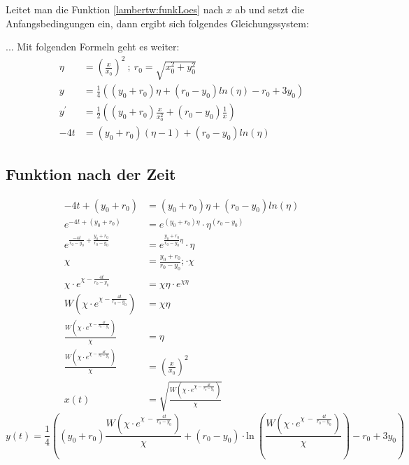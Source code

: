 Leitet man die Funktion \eqref{lambertw:funkLoes} nach \(x\) ab und setzt die Anfangsbedingungen ein, dann ergibt sich folgendes Gleichungssystem:

... Mit folgenden Formeln geht es weiter:
\begin{align*}
	\eta
	&=
	\left(\frac{x}{x_0}\right)^2 
	\:;\:
	r_0
	=
	\sqrt{x_0^2+y_0^2} \\
	y
	&=
	\frac{1}{4}\left(\left(y_0+r_0\right)\eta+\left(r_0-y_0\right)ln\left(\eta\right)-r_0+3y_0\right) \\
	y^\prime
	&=
	\frac{1}{2}\left(\left(y_0+r_0\right)\frac{x}{x_0^2}+\left(r_0-y_0\right)\frac{1}{x}\right) \\
	-4t
	&=
	\left(y_0+r_0\right)\left(\eta-1\right)+\left(r_0-y_0\right)ln\left(\eta\right)
\end{align*}

\subsection{Funktion nach der Zeit 
	\label{lambertw:subsection:FunkNachT}}
\begin{align*}
	-4t+\left(y_0+r_0\right)
	&=
	\left(y_0+r_0\right)\eta+\left(r_0-y_0\right)ln\left(\eta\right) \\
	e^{-4t+\left(y_0+r_0\right)}
	&=
	e^{\left(y_0+r_0\right)\eta}\cdot\eta^{\left(r_0-y_0\right)} \\
	e^{\frac{-4t}{r_0-y_0}+\frac{y_0+r_0}{r_0-y_0}}
	&=
	e^{\frac{y_0+r_0}{r_0-y_0}\eta}\cdot\eta\  \\
	\chi
	&=
	\frac{y_0+r_0}{r_0-y_0}; \cdot\chi \\
	\chi\cdot e^{\chi-\frac{4t}{r_0-y_0}}
	&=
	\chi\eta\cdot e^{\chi\eta} \\
	W\left(\chi\cdot e^{\chi-\frac{4t}{r_0-y_0}}\right)
	&=
	\chi\eta \\
	\frac{W\left(\chi\cdot e^{\chi-\frac{4t}{r_0-y_0}}\right)}{\chi}
	&=
	\eta \\
	\frac{W\left(\chi\cdot e^{\chi-\frac{4t}{r_0-y_0}}\right)}{\chi}
	&=
	\left(\frac{x}{x_0}\right)^2 \\
	x\left(t\right)
	&=
	\sqrt{\frac{W\left(\chi\cdot e^{\chi-\frac{4t}{r_0-y_0}}\right)}{\chi}}
\end{align*}
\begin{equation}
	y(t)
	=
	\frac{1}{4}\left(\left(y_0+r_0\right)\frac{W\left(\chi\cdot e^{\chi\ -\ \frac{4t}{r_0-y_0}}\right)}{\chi}+\left(r_0-y_0\right)\cdot\mathrm{ln}\ \left(\frac{W\left(\chi\cdot e^{\chi\ -\ \frac{4t}{r_0-y_0}}\right)}{\chi}\right)-r_0+3y_0\right)
	\label{lambertw:funkNachT}
\end{equation}
